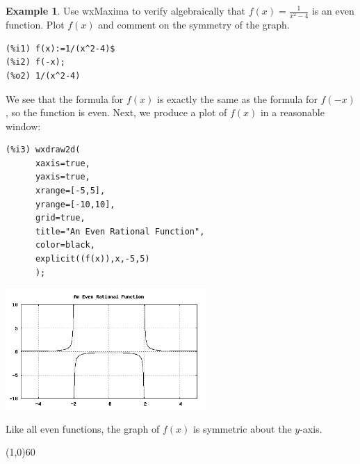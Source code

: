\documentclass[10.5pt,twoside]{report}
\theoremstyle{definition}
\newtheorem{exmp}{Example}[section]
\begin{document}
\begin{exmp}
Use wxMaxima to verify algebraically that $f(x)=\frac{1}{x^2-4}$ is an even function.  Plot $f(x)$ and comment on the symmetry of the graph.\\

\begin{verbatim}
(%i1) f(x):=1/(x^2-4)$
(%i2) f(-x);
(%o2) 1/(x^2-4)
\end{verbatim}

We see that the formula for $f(x)$ is exactly the same as the formula for $f(-x)$, so the function is even.  Next, we produce a plot of $f(x)$ in a reasonable window:

\begin{verbatim}
(%i3) wxdraw2d(
      xaxis=true,
      yaxis=true,
      xrange=[-5,5],
      yrange=[-10,10],
      grid=true,
      title="An Even Rational Function",
      color=black,
      explicit((f(x)),x,-5,5)
      ); 
\end{verbatim}


\includegraphics[width=3in]{example_2_1_1}

Like all even functions, the graph of $f(x)$ is symmetric about the $y$-axis.

\end{exmp}

\line(1,0){60}
\linethickness{0.5mm}
\end{document}

